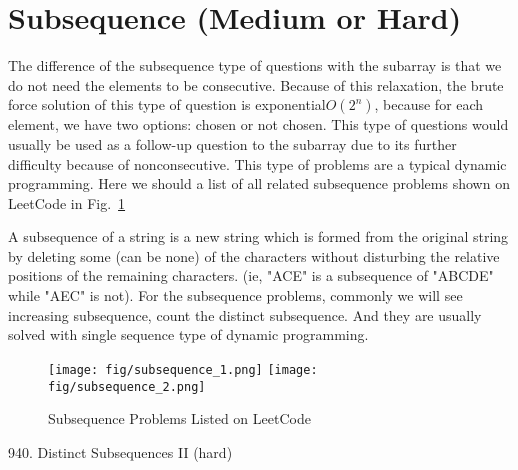 \documentclass[../main.tex]{subfiles}
\begin{document}


%
\section{Subsequence (Medium or Hard)}
The difference of the subsequence type of questions with the subarray is that we do not need the elements to be consecutive. Because of this relaxation, the brute force solution of this type of question is exponential$O(2^n)$, because for each element, we have two options: chosen or not chosen. This type of questions would usually be used as a follow-up question to the subarray due to its further difficulty because of nonconsecutive. This type of problems are a typical dynamic programming. Here we should a list of all related subsequence problems shown on LeetCode in Fig.~\ref{fig:subsequence_problems}

A subsequence of a string is a new string which is formed from the original string by deleting some (can be none) of the characters without disturbing the relative positions of the remaining characters. (ie, "ACE" is a subsequence of "ABCDE" while "AEC" is not). For the subsequence problems, commonly we will see increasing subsequence, count the distinct subsequence. And they are usually solved with single sequence type of dynamic programming. 
\begin{figure}[h]
    \centering
    \texttt{[image: fig/subsequence\_1.png]}
    \texttt{[image: fig/subsequence\_2.png]}
    \caption{Subsequence Problems Listed on LeetCode}
    \label{fig:subsequence_problems}
\end{figure}
940. Distinct Subsequences II (hard)
\end{document}
